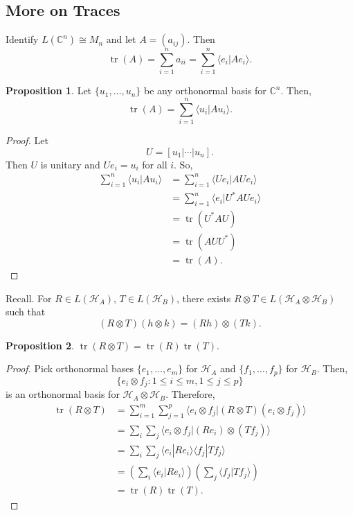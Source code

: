 \documentclass[12pt]{article}
\theoremstyle{definition}
\newtheorem*{proposition}{Proposition}
\DeclareMathOperator{\tr}{tr}
\newcommand{\C}{\mathbb{C}}
\begin{document}
\subsection{More on Traces}

Identify $L(\C^n) \cong M_n$ and let $A = (a_{ij})$. Then
\[
\tr(A) = \sum_{i=1}^n a_{ii} = \sum_{i=1}^n \langle e_i|Ae_i\rangle.
\]

\begin{proposition}
Let $\{u_1,\ldots,u_n\}$ be any orthonormal basis for $\C^n$. Then,
\[
\tr(A) = \sum_{i=1}^n \langle u_i|Au_i\rangle.
\]
\end{proposition}

\begin{proof}
Let
\[
U = [u_1|\cdots|u_n].
\]
Then $U$ is unitary and $Ue_i = u_i$ for all $i$. So,
\begin{align*}
\sum_{i=1}^n \langle u_i|Au_i\rangle &= \sum_{i=1}^n \langle Ue_i|AUe_i\rangle \\
&= \sum_{i=1}^n \langle e_i|U^*AUe_i\rangle \\
&= \tr(U^*AU) \\
&= \tr(AUU^*) \\
&= \tr(A).
\end{align*}
\end{proof}

Recall. For $R \in L(\mathcal{H}_A)$, $T \in L(\mathcal{H}_B)$, there exists $R \otimes T \in L(\mathcal{H}_A \otimes \mathcal{H}_B)$ such that
\[
(R \otimes T)(h \otimes k) = (Rh) \otimes (Tk).
\]

\begin{proposition}
$\tr(R \otimes T) = \tr(R)\tr(T)$.
\end{proposition}

\begin{proof}
Pick orthonormal bases $\{e_1,\ldots,e_m\}$ for $\mathcal{H}_A$ and $\{f_1,\ldots,f_p\}$ for $\mathcal{H}_B$. Then,
\[
\{e_i \otimes f_j : 1 \leq i \leq m, 1 \leq j \leq p\}
\]
is an orthonormal basis for $\mathcal{H}_A \otimes \mathcal{H}_B$. Therefore,
\begin{align*}
\tr(R \otimes T) &= \sum_{i=1}^m \sum_{j=1}^p \langle e_i \otimes f_j|(R \otimes T)(e_i \otimes f_j)\rangle \\
&= \sum_i \sum_j \langle e_i \otimes f_j|(Re_i) \otimes (Tf_j)\rangle \\
&= \sum_i \sum_j \langle e_i|Re_i\rangle \langle f_j|Tf_j\rangle \\
&= \left(\sum_i \langle e_i|Re_i\rangle\right)\left(\sum_j \langle f_j|Tf_j\rangle\right) \\
&= \tr(R)\tr(T).
\end{align*}
\end{proof}
\end{document}

